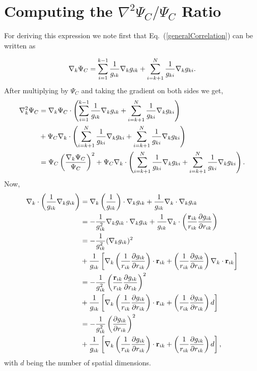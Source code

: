 \section{Computing the $\nabla^2 \Psi_C/\Psi_C$ Ratio}\label{lapCorOpt}

For deriving this expression we note first that Eq.~(\ref{generalCorrelation}) can be written as 

$${\bf \nabla}_k \Psi_C = 
\sum_{i=1}^{k-1}\frac{1}{g_{ik}} {\bf \nabla}_k g_{ik}
+
\sum_{i=k+1}^{N}\frac{1}{g_{ki}}{\bf \nabla}_k g_{ki}.$$
After multiplying by $\Psi_C$ and taking the gradient on both sides we get,
\begin{align}\label{gradLap}
\nabla_{k}^2 \Psi_C & = {\bf \nabla}_k \Psi_C \cdot 
\left(\sum_{i=1}^{k-1}\frac{1}{g_{ik}} {\bf \nabla}_k g_{ik}
+
\sum_{i=k+1}^{N}\frac{1}{g_{ki}}{\bf \nabla}_k g_{ki}\right)\nonumber\\
&+
\Psi_C \nabla_k \cdot \left(\sum_{i=k+1}^{N}\frac{1}{g_{ki}}{\bf \nabla}_k g_{ki}
+
\sum_{i=k+1}^{N}\frac{1}{g_{ki}}{\bf \nabla}_k g_{ki}\right)\nonumber\\
& = \Psi_C \left(\frac{{\bf \nabla}_k \Psi_C}{\Psi_C}\right)^2 +
\Psi_C \nabla_k \cdot \left(\sum_{i=k+1}^{N}\frac{1}{g_{ki}}{\bf \nabla}_k g_{ki}
+
\sum_{i=k+1}^{N}\frac{1}{g_{ki}}{\bf \nabla}_k g_{ki}\right).
\end{align}
Now,
\begin{align}
 {\bf \nabla}_k \cdot \left(\frac{1}{g_{ik}}{\bf \nabla}_k g_{ik}\right) &= {\bf \nabla}_k \left(\frac{1}{g_{ik}}\right)\cdot {\bf \nabla}_k g_{ik} + \frac{1}{g_{ik}}{\bf \nabla}_k \cdot {\bf \nabla}_k g_{ik}\nonumber\\
 & = -\frac{1}{g_{ik}^2} {\bf \nabla}_k g_{ik} \cdot {\bf \nabla}_k g_{ik} + \frac{1}{g_{ik}} {\bf \nabla}_k \cdot \left(\frac{{\bf r}_{ik}}{r_{ik}}\frac{\partial g_{ik}}{\partial r_{ik}}\right)\nonumber\\
 & = -\frac{1}{g_{ik}^2} ({\bf \nabla}_k g_{ik})^2 \nonumber\\&+ \frac{1}{g_{ik}}\left[{\bf \nabla}_k \left(\frac{1}{r_{ik}}\frac{\partial g_{ik}}{\partial r_{ik}}\right)\cdot {\bf r}_{ik} + \left(\frac{1}{r_{ik}}\frac{\partial g_{ik}}{\partial r_{ik}}\right) {\bf \nabla}_k \cdot {\bf r}_{ik}  \right] \nonumber\\
 &= -\frac{1}{g_{ik}^2} \left(\frac{{\bf r}_{ik}}{r_{ik}}\frac{\partial g_{ik}}{\partial r_{ik}}\right)^2\nonumber\\ &+ \frac{1}{g_{ik}}\left[{\bf \nabla}_k \left(\frac{1}{r_{ik}}\frac{\partial g_{ik}}{\partial r_{ik}}\right)\cdot {\bf r}_{ik} + \left(\frac{1}{r_{ik}}\frac{\partial g_{ik}}{\partial r_{ik}}\right) d  \right]\nonumber\\
 &= -\frac{1}{g_{ik}^2} \left(\frac{\partial g_{ik}}{\partial r_{ik}}\right)^2\nonumber\\ &+ \frac{1}{g_{ik}}\left[{\bf \nabla}_k \left(\frac{1}{r_{ik}}\frac{\partial g_{ik}}{\partial r_{ik}}\right)\cdot {\bf r}_{ik} + \left(\frac{1}{r_{ik}}\frac{\partial g_{ik}}{\partial r_{ik}}\right) d  \right], \label{subs0}
 \end{align}
with $d$ being the number of spatial dimensions.

